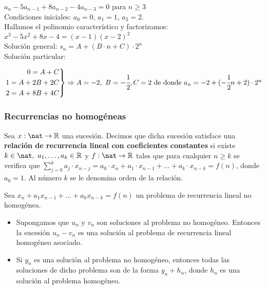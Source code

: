 \begin{ejemplo} $a_{n} - 5a_{n-1} +8a_{n-2} -4a_{n-3} = 0$ para $n \geq 3$ \\
    Condiciones iniciales: $a_{0} = 0$, $a_{1} = 1$, $a_2 = 2$.\\
    Hallamos el polinomio característico y factorizamos: $x^3 -5x^2 +8x -4 = (x-1)(x-2)^2$\\
    Solución general: $s_{n} = A + (B \cdot n + C) \cdot 2^n$ \\
    Solución particular:
    \begin{center}
        $\left.
            \begin{aligned}
                0 = A + C       \\
                1 = A + 2B + 2C \\
                2 = A + 8B + 4C
            \end{aligned} \right \}
            \Rightarrow A = -2 , \ B = -\cfrac{1}{2}, C = 2  \text{ de donde } a_n = -2 + (-\cfrac{1}{2}n + 2) \cdot 2^n$
    \end{center}
\end{ejemplo}
\smallskip

\subsubsection{Recurrencias no homogéneas}
\begin{ndef}
    Sea $x: \nat \rightarrow \mathbb{R}$ una sucesión. Decimos que dicha sucesión satisface una \textbf{relación de recurrencia lineal con coeficientes constantes}
    si existe $ k \in \nat, \ a_1, \dots , a_k \in \mathbb{R}$ y $f:\nat \rightarrow \mathbb{R}$ tales que para cualquier $n \geq k$ se verifica que
    $\sum_{j=0}^k a_j \cdot x_{n-j} = a_0 \cdot x_n + a_1 \cdot x_{n-1} + \ldots + a_k \cdot x_{n-k} = f(n)$,
    donde $a_0 = 1$.
    Al número $k$ se le denomina orden de la relación.
\end{ndef}

\begin{nprop}
    Sea $x_n + a_1x_{n-1} + \ldots + a_kx_{n-k} = f(n)$ un problema de recurrencia lineal no homogénea.
    \begin{itemize}
        \item Supongamos que $u_n$ y $v_n$ son soluciones al problema no homogéneo. Entonces la sucesión $u_n - v_n$ es una solución al problema de recurrencia lineal homogéneo asociado.
        \item Si $y_n$ es una solución al problema no homogéneo, entonces todas las soluciones de dicho problema son de la forma $y_n + h_n$, donde $h_n$ es una solución al problema homogéneo.
    \end{itemize}
\end{nprop}

